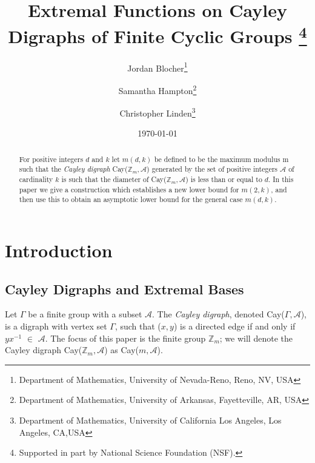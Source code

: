 \documentclass[11pt]{article}
\title{Extremal Functions on Cayley Digraphs of Finite Cyclic Groups \footnote{Supported in part by National Science Foundation (NSF).}}
\author{Jordan Blocher\thanks{Department of Mathematics, University of Nevada-Reno, Reno, NV, USA}\and Samantha Hampton\thanks{Department of Mathematics, University of Arkansas, Fayetteville, AR, USA}\and Christopher Linden\thanks{Department of Mathematics, University of California Los Angeles, Los Angeles, CA,USA } }
\date{\today}
\theoremstyle{definition}
\def\Z{\mbox{$\mathbb Z$}}
\begin{document}
 
\baselineskip6mm\parskip4mm

\maketitle

\begin{abstract}
For positive integers $d$ and $k$ let $m(d,k)$ be defined to be the maximum modulus m such that the \emph{Cayley digraph} Cay($\Z_{m}, \mathcal{A}$) generated by the set of positive integers $\mathcal{A}$ of cardinality $k$ is such that the diameter of Cay($\Z_{m}, \mathcal{A}$) is less than or equal to $d$. 
In this paper we give a construction which establishes a new lower bound for $m(2, k)$, and then use this to obtain an asymptotic lower bound for the general case $m(d,k)$.
\end{abstract}
 
\pagebreak

\section{Introduction}
\subsection{Cayley Digraphs and Extremal Bases} 
Let $\Gamma$ be a finite group with a subset $\mathcal{A}$. The \emph{Cayley digraph}, denoted Cay($\Gamma, \mathcal{A}$), is a digraph with vertex set $\Gamma$, such that ($x, y$) is a directed edge if and only if $yx^{-1}$ $\in$ $\mathcal{A}$.
The focus of this paper is the finite group $\Z_m$; we will denote the Cayley digraph Cay($\Z_m, \mathcal{A}$) as Cay($m, \mathcal{A}$).
\end{document}
